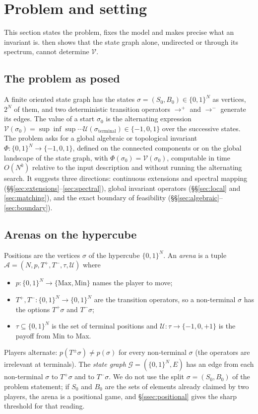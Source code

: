 \documentclass[11pt]{amsart}
\theoremstyle{plain}
\theoremstyle{definition}
\theoremstyle{remark}
\numberwithin{equation}{section}
\newcommand{\val}{\mathcal{V}}            %
\newcommand{\pay}{\mathcal{U}}            %
\newcommand{\SG}{\mathcal{G}}             %
\newcommand{\arena}{\mathcal{A}}          %
\begin{document}
\section{Problem and setting}\label{sec:setting}

This section states the problem, fixes the model and makes precise what an invariant is.  then shows that the state graph alone, undirected or through its spectrum, cannot determine $\val$.

\subsection*{The problem as posed}
A finite oriented state graph has the states $\sigma=(S_0,B_0)\in\{0,1\}^N$ as vertices, $2^N$ of them, and two deterministic transition operators $\to^{+}$ and $\to^{-}$ generate its edges. The value of a start $\sigma_0$ is the alternating expression $\val(\sigma_0)=\sup\inf\sup\cdots\pay(\sigma_{\mathrm{terminal}})\in\{-1,0,1\}$ over the successive states. The problem asks for a global algebraic or topological invariant $\Phi\colon\{0,1\}^N\to\{-1,0,1\}$, defined on the connected components or on the global landscape of the state graph, with $\Phi(\sigma_0)=\val(\sigma_0)$, computable in time $O(N^k)$ relative to the input description and without running the alternating search. It suggests three directions: continuous extensions and spectral mapping (\S\S\ref{sec:extensions}--\ref{sec:spectral}), global invariant operators (\S\S\ref{sec:local} and \ref{sec:matching}), and the exact boundary of feasibility (\S\S\ref{sec:algebraic}--\ref{sec:boundary}).

\subsection{Arenas on the hypercube}\label{ssec:arenas}
Positions are the vertices $\sigma$ of the hypercube $\{0,1\}^N$. An \emph{arena} is a tuple $\arena=(N,p,T^{+},T^{-},\tau,\pay)$ where
\begin{itemize}
\item $p\colon\{0,1\}^N\to\{\mathrm{Max},\mathrm{Min}\}$ names the player to move;
\item $T^{+},T^{-}\colon\{0,1\}^N\to\{0,1\}^N$ are the transition operators, so a non-terminal $\sigma$ has the options $T^{+}\sigma$ and $T^{-}\sigma$;
\item $\tau\subseteq\{0,1\}^N$ is the set of terminal positions and $\pay\colon\tau\to\{-1,0,+1\}$ is the payoff from Min to Max.
\end{itemize}
Players alternate: $p(T^{\pm}\sigma)\neq p(\sigma)$ for every non-terminal $\sigma$ (the operators are irrelevant at terminals). The \emph{state graph} $\SG=(\{0,1\}^N,E)$ has an edge from each non-terminal $\sigma$ to $T^{+}\sigma$ and to $T^{-}\sigma$. We do not use the split $\sigma=(S_0,B_0)$ of the problem statement; if $S_0$ and $B_0$ are the sets of elements already claimed by two players, the arena is a positional game, and \S\ref{ssec:positional} gives the sharp threshold for that reading.
\end{document}
